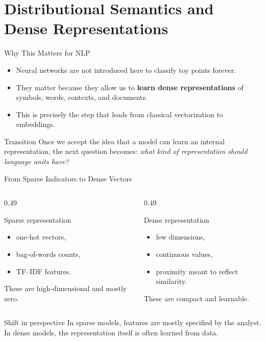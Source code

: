 \documentclass[11pt,aspectratio=169,professionalfonts]{beamer}
\begin{document}
\section{Distributional Semantics and Dense Representations}
%
\begin{frame}{Why This Matters for NLP}
\begin{itemize}
    \item Neural networks are not introduced here to classify toy points forever.
    \item They matter because they allow us to \textbf{learn dense representations} of symbols, words, contexts, and documents.
    \item This is precisely the step that leads from classical vectorization to embeddings.
\end{itemize}

\vspace{0.2cm}
\begin{alertblock}{Transition}
Once we accept the idea that a model can learn an internal representation, the next question becomes: \emph{what kind of representation should language units have?}
\end{alertblock}
\end{frame}
%
%
\begin{frame}{From Sparse Indicators to Dense Vectors}
\begin{columns}[T]
\begin{column}{0.49\textwidth}
\begin{block}{Sparse representation}
\begin{itemize}
    \item one-hot vectors,
    \item bag-of-words counts,
    \item TF--IDF features.
\end{itemize}
These are high-dimensional and mostly zero.
\end{block}
\end{column}
\begin{column}{0.49\textwidth}
\begin{block}{Dense representation}
\begin{itemize}
    \item few dimensions,
    \item continuous values,
    \item proximity meant to reflect similarity.
\end{itemize}
These are compact and learnable.
\end{block}
\end{column}
\end{columns}

\vspace{0.2cm}
\begin{alertblock}{Shift in perspective}
In sparse models, features are mostly specified by the analyst. In dense models, the representation itself is often learned from data.
\end{alertblock}
\end{frame}
\end{document}
